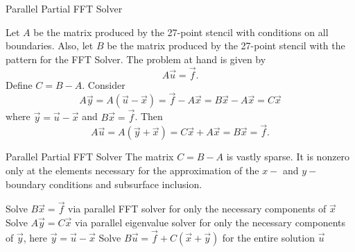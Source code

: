 \documentclass[handout]{beamer}
\begin{document}


\begin{frame}{Parallel Partial FFT Solver}

Let $A$ be the matrix produced by the 27-point stencil with \somm conditions on all boundaries. Also, let $B$ be the matrix produced by the 27-point stencil with the pattern for the FFT Solver. The problem at hand is given by
\[A\vec{u}=\vec{f}.\]
Define $C = B-A$. Consider
\[A\vec{y} = A(\vec{u}-\vec{x}) = \vec{f}-A\vec{x} = B\vec{x}-A\vec{x} = C\vec{x} \]
where $\vec{y} = \vec{u}-\vec{x}$ and $B\vec{x}=\vec{f}$. Then
\[A\vec{u} = A(\vec{y}+\vec{x}) = C\vec{x}+A\vec{x} = B\vec{x}=\vec{f}.\]
\end{frame}



\begin{frame}{Parallel Partial FFT Solver}
The matrix $C=B-A$ is vastly sparse. It is nonzero only at the elements necessary for the approximation of the $x-$ and $y-$ \somm boundary conditions and subsurface inclusion.
\begin{algorithm}[H]
\caption{Parallel Partial FFT Solver}\label{alg:general_partial_fft}
\begin{spacing}{\algorithmSpacing}
\begin{algorithmic}[1]
\STATE Solve $B\vec{x}=\vec{f}$ via parallel FFT solver for only the necessary components of $\vec{x}$
\STATE Solve $A\vec{y}=C\vec{x}$ via parallel eigenvalue solver for only the necessary components of $\vec{y}$, here $\vec{y} = \vec{u}-\vec{x}$
\STATE Solve $B\vec{u}=\vec{f} + C(\vec{x}+\vec{y})$ for the entire solution $\vec{u}$
\end{algorithmic}
\end{spacing}
\end{algorithm}
\end{frame}
\end{document}

